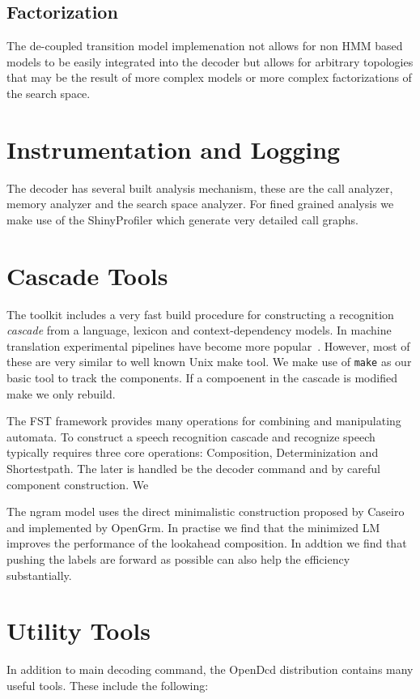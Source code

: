 \documentclass{article}
\begin{document}
\subsection{Factorization}
The de-coupled transition model implemenation not allows for non HMM based models to be easily
integrated into the decoder but allows for arbitrary topologies that may be the result of more
complex models or more complex factorizations of the search space.


\section{Instrumentation and Logging}
\label{sec:instrumentation}
The decoder has several built analysis mechanism, these are the call analyzer,
memory analyzer and the search space analyzer. For fined grained analysis we 
make use of the ShinyProfiler which generate very detailed call graphs.

\section{Cascade Tools}
\label{sec:cascade}
The toolkit includes a very fast build procedure for constructing a recognition
\emph{cascade} from a language, lexicon and context-dependency models. In 
machine translation experimental pipelines have become more popular~\cite{koehn10}. 
However, most of these are very similar to well known Unix make tool. We make 
use of \texttt{make} as our basic tool to track the components. 
If a compoenent in the cascade is modified make we only rebuild.

The FST framework provides many operations for combining and manipulating
automata. To construct a speech recognition cascade and recognize speech 
typically requires three core operations: Composition, Determinization and
Shortestpath. The later is handled be the decoder command and by careful
component construction. We 

The ngram model uses the direct minimalistic construction proposed by
Caseiro~\cite{caseiro01} and implemented by OpenGrm. In practise we 
find that the minimized LM improves the performance of the lookahead composition.
In addtion we find that pushing the labels are forward as possible can also help
the efficiency substantially.

\section{Utility Tools}
\label{sec:postprocess}
In addition to main decoding command, the OpenDcd distribution contains
many useful tools. These include the following:
\end{document}
